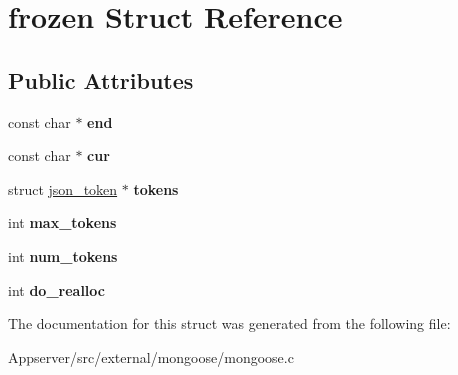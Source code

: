 \hypertarget{structfrozen}{}\section{frozen Struct Reference}
\label{structfrozen}
\subsection*{Public Attributes}
\begin{DoxyCompactItemize}
\item 
const char $\ast$ {\bfseries end}\hypertarget{structfrozen_a262986511243893cb6d0c424a533da6e}{}\label{structfrozen_a262986511243893cb6d0c424a533da6e}

\item 
const char $\ast$ {\bfseries cur}\hypertarget{structfrozen_a3a7cf08b9ba2b16d9c31be9c7ec65cb2}{}\label{structfrozen_a3a7cf08b9ba2b16d9c31be9c7ec65cb2}

\item 
struct \hyperlink{structjson__token}{json\+\_\+token} $\ast$ {\bfseries tokens}\hypertarget{structfrozen_afc396df24f82640326ba74df00082729}{}\label{structfrozen_afc396df24f82640326ba74df00082729}

\item 
int {\bfseries max\+\_\+tokens}\hypertarget{structfrozen_aee94f69748176e6e79b81147e0eee896}{}\label{structfrozen_aee94f69748176e6e79b81147e0eee896}

\item 
int {\bfseries num\+\_\+tokens}\hypertarget{structfrozen_abaabb9c26246e03c6c8f5da00fbef4cf}{}\label{structfrozen_abaabb9c26246e03c6c8f5da00fbef4cf}

\item 
int {\bfseries do\+\_\+realloc}\hypertarget{structfrozen_ac5827a169232910711a7db323eaa6aef}{}\label{structfrozen_ac5827a169232910711a7db323eaa6aef}

\end{DoxyCompactItemize}


The documentation for this struct was generated from the following file\+:\begin{DoxyCompactItemize}
\item 
Appserver/src/external/mongoose/mongoose.\+c\end{DoxyCompactItemize}
